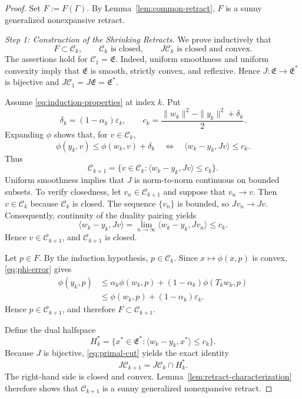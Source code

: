\documentclass[leqno,12pt]{amsart}
\theoremstyle{definition}
\theoremstyle{remark}
\numberwithin{equation}{section}
\newcommand{\E}{\mathfrak{E}}
\newcommand{\C}{\mathscr{C}}
\begin{document}
\begin{proof}
Set $F:=F(\Gamma)$. By Lemma~\ref{lem:common-retract}, $F$ is a sunny generalized nonexpansive retract.

\smallskip
\noindent\emph{Step 1: Construction of the Shrinking Retracts.}
We prove inductively that
\begin{equation}\label{eq:induction-properties}
 F\subset\C_k,\qquad \C_k\text{ is closed},\qquad J\C_k\text{ is closed and convex}.
\end{equation}
The assertions hold for $\C_1=\E$. Indeed, uniform smoothness and uniform convexity imply that $\E$ is smooth, strictly convex, and reflexive. Hence $J:\E\to\E^*$ is bijective and $J\C_1=J\E=\E^*$.

Assume \eqref{eq:induction-properties} at index $k$. Put
\[
 \delta_k=(1-\alpha_k)\varepsilon_k,
 \qquad
 c_k=\frac{\|w_k\|^2-\|y_k\|^2+\delta_k}{2}.
\]
Expanding $\phi$ shows that, for $v\in\C_k$,
\[
 \phi(y_k,v)\leq\phi(w_k,v)+\delta_k
 \quad\Longleftrightarrow\quad
 \langle w_k-y_k,Jv\rangle\leq c_k.
\]
Thus
\begin{equation}\label{eq:primal-cut}
 \C_{k+1}=\{v\in\C_k:\langle w_k-y_k,Jv\rangle\leq c_k\}.
\end{equation}
Uniform smoothness implies that $J$ is norm-to-norm continuous on bounded subsets. To verify closedness, let $v_n\in\C_{k+1}$ and suppose that $v_n\to v$. Then $v\in\C_k$ because $\C_k$ is closed. The sequence $\{v_n\}$ is bounded, so $Jv_n\to Jv$. Consequently, continuity of the duality pairing yields
\[
 \langle w_k-y_k,Jv\rangle
 =\lim_{n\to\infty}\langle w_k-y_k,Jv_n\rangle\leq c_k.
\]
Hence $v\in\C_{k+1}$, and $\C_{k+1}$ is closed.

Let $p\in F$. By the induction hypothesis, $p\in\C_k$. Since $x\mapsto\phi(x,p)$ is convex, \eqref{eq:phi-error} gives
\begin{align*}
 \phi(y_k,p)
 &\leq \alpha_k\phi(w_k,p)+(1-\alpha_k)\phi(T_kw_k,p)\\
 &\leq \phi(w_k,p)+(1-\alpha_k)\varepsilon_k.
\end{align*}
Hence $p\in\C_{k+1}$, and therefore $F\subset\C_{k+1}$.

Define the dual halfspace
\[
 H_k^*=\{x^*\in\E^*:\langle w_k-y_k,x^*\rangle\leq c_k\}.
\]
Because $J$ is bijective, \eqref{eq:primal-cut} yields the exact identity
\[
 J\C_{k+1}=J\C_k\cap H_k^*.
\]
The right-hand side is closed and convex. Lemma~\ref{lem:retract-characterization} therefore shows that $\C_{k+1}$ is a sunny generalized nonexpansive retract.


\end{proof}
\end{document}
